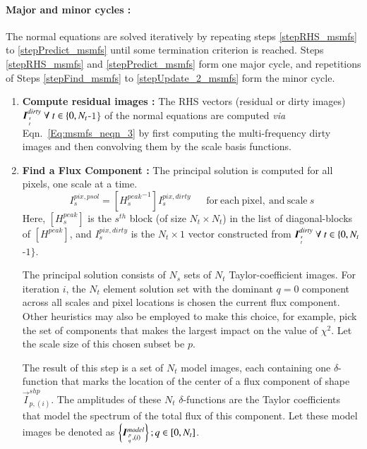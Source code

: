 \documentclass[structabstract]{stylefiles/aa}
\newcommand{\I}{{\vec{I}}}
\begin{document}
\noindent\paragraph{\bf Major and minor cycles : }
The normal equations are solved iteratively by repeating steps 
\ref{stepRHS_msmfs} to \ref{stepPredict_msmfs} until some termination criterion is reached.
Steps \ref{stepRHS_msmfs} and \ref{stepPredict_msmfs} form one major cycle, 
and repetitions of Steps \ref{stepFind_msmfs} to \ref{stepUpdate_2_msmfs} form the minor cycle.
\begin{enumerate}
\item\label{stepRHS_msmfs} {\bf Compute residual images :} The RHS vectors 
(residual or dirty images) $\vec{I}^{dirty}_{{s}\atop{t}} ~\forall~t\in\{0,N_t$-$1\}$
of the normal equations are computed {\it via} Eqn.~\ref{Eq:msmfs_neqn_3} by first
computing the multi-frequency dirty images and then convolving them by the
scale basis functions.

\item\label{stepFind_msmfs} {\bf Find a Flux Component :}
The principal solution is computed for all pixels, one scale at a time.
\begin{equation}
I^{pix,psol}_s = [{H^{peak}_s}^{-1}] I^{pix,dirty}_s ~~~~~~~\mathrm{for~each~pixel,~and~scale} ~s
\label{Eq:msmfs_psol}
\end{equation}
Here,  $[H^{peak}_s]$ is the $s^{th}$ block (of size $N_t\times N_t$)
in the list of diagonal-blocks of $[H^{peak}]$, 
and $I^{pix,dirty}_s$ is the $N_t\times 1$ vector constructed 
from $\vec{I}^{dirty}_{{s}\atop{t}} ~\forall~t\in\{0,N_t$-$1\}$.

The principal solution consists of $N_s$ sets of 
$N_t$ Taylor-coefficient images.
For iteration $i$, the $N_t$ element solution set 
with the dominant $q=0$ component across all scales and pixel locations
is chosen the current flux component. Other heuristics may also be employed
to make this choice, for example, pick the set of components that makes the
largest impact on the value of $\chi^2$. 
Let the scale size of this chosen subset be $p$. 

The result of this step is a set of $N_t$ model images, each containing one 
$\delta$-function that marks the location of the center of a flux component
of shape $\I^{shp}_{p,(i)}$. The amplitudes of these $N_t$ $\delta$-functions
are the Taylor coefficients that model the spectrum of the total flux of 
this component. Let these model images be denoted as 
$\left\{\vec{I}^{model}_{{{p}\atop{q}},(i)}\right\};q\in[0,N_t]$.


\end{enumerate}
\end{document}

